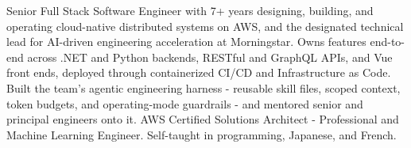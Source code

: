 ﻿

\begin{cvparagraph}
Senior Full Stack Software Engineer with 7+ years designing, building, and operating cloud-native distributed systems on AWS, and the designated technical lead for AI-driven engineering acceleration at Morningstar. Owns features end-to-end across .NET and Python backends, RESTful and GraphQL APIs, and Vue front ends, deployed through containerized CI/CD and Infrastructure as Code. Built the team's agentic engineering harness - reusable skill files, scoped context, token budgets, and operating-mode guardrails - and mentored senior and principal engineers onto it. AWS Certified Solutions Architect - Professional and Machine Learning Engineer. Self-taught in programming, Japanese, and French.
\end{cvparagraph}

